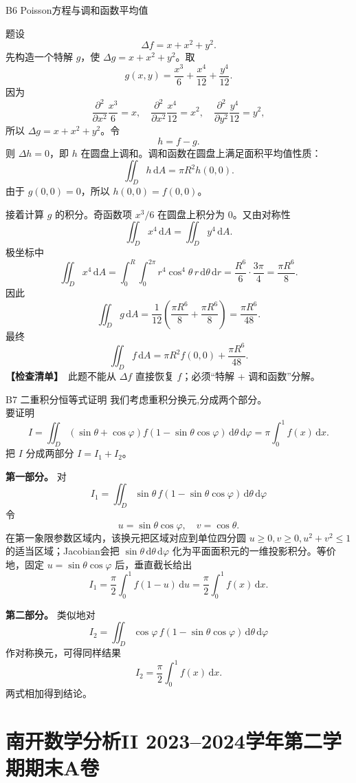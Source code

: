 \documentclass[UTF8,zihao=-4,openany]{ctexbook}
\newcommand{\dd}{\,\mathrm{d}}
\newcommand{\checklist}{\textcolor{theogreen}{\bfseries【检查清单】}}
\begin{document}
\begin{solutionbox}{B6 Poisson方程与调和函数平均值}

题设
\[
\Delta f=x+x^2+y^2.
\]
先构造一个特解 $g$，使 $\Delta g=x+x^2+y^2$。取
\[
g(x,y)=\frac{x^3}{6}+\frac{x^4}{12}+\frac{y^4}{12}.
\]
因为
\[
\frac{\partial^2}{\partial x^2}\frac{x^3}{6}=x,
\quad
\frac{\partial^2}{\partial x^2}\frac{x^4}{12}=x^2,
\quad
\frac{\partial^2}{\partial y^2}\frac{y^4}{12}=y^2,
\]
所以 $\Delta g=x+x^2+y^2$。令
\[
h=f-g.
\]
则 $\Delta h=0$，即 $h$ 在圆盘上调和。调和函数在圆盘上满足面积平均值性质：
\[
\iint_Dh\dd A=\pi R^2h(0,0).
\]
由于 $g(0,0)=0$，所以 $h(0,0)=f(0,0)$。

接着计算 $g$ 的积分。奇函数项 $x^3/6$ 在圆盘上积分为 $0$。又由对称性
\[
\iint_Dx^4\dd A=\iint_Dy^4\dd A.
\]
极坐标中
\[
\iint_Dx^4\dd A=\int_0^R\int_0^{2\pi}r^4\cos^4\theta\,r\dd\theta\dd r
=\frac{R^6}{6}\cdot\frac{3\pi}{4}=\frac{\pi R^6}{8}.
\]
因此
\[
\iint_Dg\dd A=\frac1{12}\left(\frac{\pi R^6}{8}+\frac{\pi R^6}{8}\right)=\frac{\pi R^6}{48}.
\]
最终
\[
\boxed{\iint_Df\dd A=\pi R^2f(0,0)+\frac{\pi R^6}{48}.}
\]
\checklist\ 此题不能从 $\Delta f$ 直接恢复 $f$；必须“特解 + 调和函数”分解。
\end{solutionbox}

\begin{solutionbox}{B7 二重积分恒等式证明}
我们考虑重积分换元,分成两个部分。\\
要证明
\[
I=\iint_D(\sin\theta+\cos\varphi)f(1-\sin\theta\cos\varphi)\dd\theta\dd\varphi
=\pi\int_0^1f(x)\dd x.
\]
把 $I$ 分成两部分 $I=I_1+I_2$。

\textbf{第一部分。} 对
\[
I_1=\iint_D\sin\theta\,f(1-\sin\theta\cos\varphi)\dd\theta\dd\varphi
\]
令
\[
u=\sin\theta\cos\varphi,
\quad
v=\cos\theta.
\]
在第一象限参数区域内，该换元把区域对应到单位四分圆 $u\ge0,v\ge0,u^2+v^2\le1$ 的适当区域；Jacobian会把 $\sin\theta\dd\theta\dd\varphi$ 化为平面面积元的一维投影积分。等价地，固定 $u=\sin\theta\cos\varphi$ 后，垂直截长给出
\[
I_1=\frac\pi2\int_0^1f(1-u)\dd u=\frac\pi2\int_0^1f(x)\dd x.
\]

\textbf{第二部分。} 类似地对
\[
I_2=\iint_D\cos\varphi\,f(1-\sin\theta\cos\varphi)\dd\theta\dd\varphi
\]
作对称换元，可得同样结果
\[
I_2=\frac\pi2\int_0^1f(x)\dd x.
\]
两式相加得到结论。

\end{solutionbox}

\chapter{南开数学分析II 2023--2024学年第二学期期末A卷}
\end{document}
